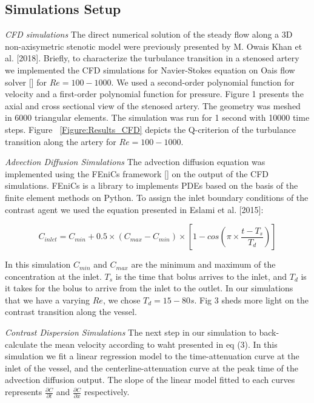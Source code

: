 \documentclass[times,twocolumn,final]{elsarticle}
\begin{document}
\subsection{Simulations Setup}
\textit{CFD simulations} The direct numerical solution of the steady flow along a 3D non-axisymetric stenotic model were previously presented by M. Owais Khan et al. [2018]. Briefly, to characterize the turbulance transition in a stenosed artery we implemented the CFD simulations for Navier-Stokes equation on Oais flow solver [] for $Re=100-1000$. We used a second-order polynomial function for velocity and a first-order polynomial function for pressure. Figure 1 presents the axial and cross sectional view of the stenosed artery. The geometry was meshed in 6000 triangular elements. The simulation was run for 1 second with 10000 time steps. Figure ~\ref{Figure:Results_CFD} depicts the Q-criterion of the turbulance transition along the artery for $Re=100-1000$. 

\textit{Advection Diffusion Simulations} The advection diffusion equation was implemented using the FEniCs framework [] on the output of the CFD simulations. FEniCs is a library to implements PDEs based on the basis of the finite element methods on Python. To assign the inlet boundary conditions of the contrast agent we used the equation presented in Eslami et al. [2015]:

\begin{equation}
C_{inlet} =  C_{min} + 0.5 \times (C_{max}-C_{min}) \times [1-cos(\pi \times \dfrac{t-T_s}{T_d})]
\end{equation}

In this simulation $C_{min}$ and $C_{max}$ are the minimum and maximum of the concentration at the inlet. $T_s$ is the time that bolus arrives to the inlet, and $T_d$ is it takes for the bolus to arrive from the inlet to the outlet. In our simulations that we have a varying $Re$, we chose $T_d = 15-80s$. Fig 3 sheds more light on the contrast transition along the vessel.

\textit{Contrast Dispersion Simulations} The next step in our simulation to back-calculate the mean velocity according to waht presented in eq (3). In this simulation we fit a linear regression model to the time-attenuation curve at the inlet of the vessel, and the centerline-attenuation curve at the peak time of the advection diffusion output. The slope of the linear model fitted to each curves represents $\frac{\partial C}{\partial t}$ and $\frac{\partial C}{\partial x}$ respectively.
\end{document}
